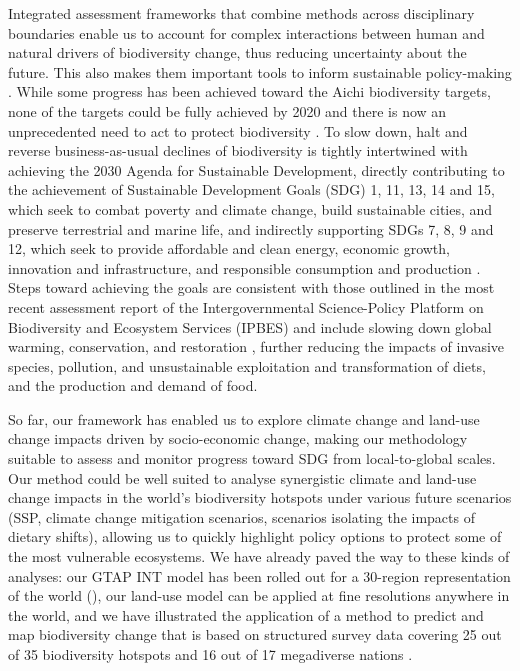 \documentclass[titlesmallcaps,copyrightpage]{uomthesis}\usepackage[]{graphicx}\usepackage[]{color}
\begin{document}
Integrated assessment frameworks that combine methods across disciplinary boundaries enable us to account for complex interactions between human and natural drivers of biodiversity change, thus reducing uncertainty about the future. This also makes them important tools to inform sustainable policy-making \citep{veerkamp_future_2020, ipbes_summary_2019, un_general_assembly_transforming_2015}.
While some progress has been achieved toward the Aichi biodiversity targets, none of the targets could be fully achieved by 2020 and there is now an unprecedented need to act to protect biodiversity \citep{scbd_global_2020}. To slow down, halt and reverse business-as-usual declines of biodiversity is tightly intertwined with achieving the 2030 Agenda for Sustainable Development, directly contributing to the achievement of Sustainable Development Goals (SDG) 1, 11, 13, 14 and 15, which seek to combat poverty and climate change, build sustainable cities, and preserve terrestrial and marine life, and indirectly supporting SDGs 7, 8, 9 and 12, which seek to provide affordable and clean energy, economic growth, innovation and infrastructure, and responsible consumption and production \citep{un_general_assembly_transforming_2015, scbd_global_2020}. Steps toward achieving the goals are consistent with those outlined in the most recent assessment report of the Intergovernmental Science-Policy Platform on Biodiversity and Ecosystem Services (IPBES) \citep{ipbes_summary_2019} and include slowing down global warming, conservation, and restoration \citep[see also the current UN Decade on Ecosystem Restoration,][]{unep_resolution_2019}, further reducing the impacts of invasive species, pollution, and unsustainable exploitation and transformation of diets, and the production and demand of food. 

So far, our framework has enabled us to explore climate change and land-use change impacts driven by socio-economic change, making our methodology suitable to assess and monitor progress toward SDG from local-to-global scales. Our method could be well suited to analyse synergistic climate and land-use change impacts in the world's biodiversity hotspots under various future scenarios (SSP, climate change mitigation scenarios, scenarios isolating the impacts of dietary shifts), allowing us to quickly highlight policy options to protect some of the most vulnerable ecosystems. We have already paved the way to these kinds of analyses: our GTAP INT model has been rolled out for a 30-region representation of the world (), our land-use model can be applied at fine resolutions anywhere in the world, and we have illustrated the application of a method to predict and map biodiversity change that is based on structured survey data covering 25 out of 35 biodiversity hotspots and 16 out of 17 megadiverse nations \citep{hudson_predicts_2014}.
\end{document}
